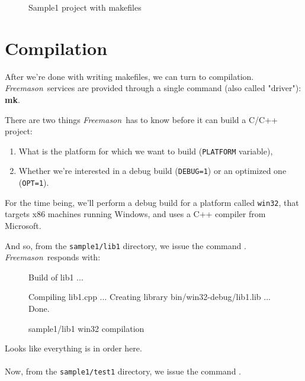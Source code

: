 \documentclass[a4paper]{article}
\newcommand{\freemason}{\textit{Freemason}}
\begin{document}
\begin{figure}[htbp]
\caption{\label{sample1:project.2}Sample1 project with makefiles}
\begin{center}\end{center}
\end{figure}

\newpage

\section{Compilation}

After we're done with writing makefiles, we can turn to compilation.
\freemason\ services are provided through a single command (also called "driver"): \textbf{mk}.
\par
There are two things \freemason\ has to know before it can build a C/C++ project:
\begin{enumerate}
	\item What is the platform for which we want to build (\verb"PLATFORM" variable),
	\item Whether we're interested in a debug build (\verb"DEBUG=1") or an optimized one (\verb"OPT=1").
\end{enumerate}
\par
For the time being, we'll perform a debug build for a platform called \verb"win32", that targets x86 machines running
Windows, and uses a C++ compiler from Microsoft.
\\
\par
And so, from the \verb"sample1/lib1" directory, we issue the command .
\\
\freemason\ responds with:

\begin{figure}[h]
\caption{\label{sample1:lib1:output}sample1/lib1 win32 compilation}
\begin{Code}
Build of lib1 ...

Compiling lib1.cpp ...
Creating library bin/win32-debug/lib1.lib ...
Done.
\end{Code}
\end{figure}

Looks like everything is in order here.
\\
\\
Now, from the \verb"sample1/test1" directory, we issue the command .
\end{document}
